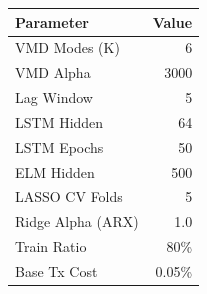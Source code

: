\begin{tabular}{lr} \toprule
Parameter & Value \\ \midrule
VMD Modes (K) & 6 \\ 
VMD Alpha & 3000 \\ 
Lag Window & 5 \\ 
LSTM Hidden & 64 \\ 
LSTM Epochs & 50 \\ 
ELM Hidden & 500 \\ 
LASSO CV Folds & 5 \\ 
Ridge Alpha (ARX) & 1.0 \\ 
Train Ratio & 80\% \\ 
Base Tx Cost & 0.05\% \\ 
\bottomrule \end{tabular}
